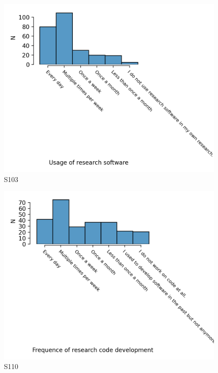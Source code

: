 \documentclass{article}
\begin{document}
\begin{figure}[h!]
    \centering
    \includegraphics[width=\textwidth]{../figs/S103.png}
	\caption{S103 }
    \label{fig:S103}
\end{figure}

\begin{figure}[h!]
    \centering
    \includegraphics[width=\textwidth]{../figs/S110.png}
	\caption{S110 }
    \label{fig:S110}
\end{figure}
\end{document}
